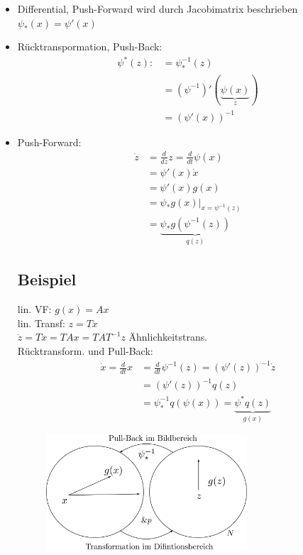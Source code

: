 \documentclass[ngerman]{tudscrreprt}
\begin{document}
\begin{itemize}
\item Differential, Push-Forward wird durch Jacobimatrix beschrieben $\psi_{*}(x) = \psi'(x) $
\item Rücktranspormation, Push-Back: 
\begin{align*}
\psi^{*} (z):&= \psi_{*}^{-1} (z)\\ 
&=(\psi^{-1})' (\underbrace{\psi(x)}_{z})\\ 
&=(\psi' (x))^{-1}   
\end{align*}
\item Push-Forward: 
\begin{align*}
\dot z &= \frac{d}{dz}  z  = \frac{d}{dt} \psi (x)\\ 
&= \psi'(x)\dot x\\ 
&= \psi'(x)g(x)\\ 
&= \psi_{*}g(x)|_{x=\psi^{-1}(z)}\\ 
&= \underbrace{\psi_{*}g(\psi^{-1} (z))}_{q(z)}
\end{align*}
\subsection*{Beispiel}lin. VF: $g(x) = Ax$\\ lin. Transf: $z= Tx$\\ 
$\dot z = T\dot x= TAx = TAT^{-1} z$ Ähnlichkeitstrans.\\ 
Rücktransform. und Pull-Back: 
\begin{align*}
\dot x = \frac{d}{dt}x &= \frac{d}{dt}\psi^{-1}(z) = (\psi'(z))^{-1}\dot z\\ 
&=(\psi'(z))^{-1}q(z)\\ 
&=\psi_{*}^{-1}q (\psi(x))=\underbrace{\psi^{*} q(z)}_{g(x)}
\end{align*}
\begin{figure}[H]
\centering
\def\svgwidth{200pt} 
  \includegraphics[width=7.5cm]{im3_121.pdf}
\end{figure}
\end{itemize}
\end{document}
